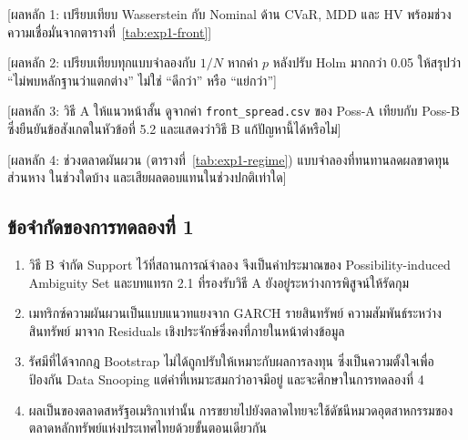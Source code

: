 [ผลหลัก 1: เปรียบเทียบ Wasserstein กับ Nominal ด้าน CVaR, MDD และ HV
พร้อมช่วงความเชื่อมั่นจากตารางที่~\ref{tab:exp1-front}]

[ผลหลัก 2: เปรียบเทียบทุกแบบจำลองกับ $1/N$ หากค่า $p$ หลังปรับ Holm มากกว่า 0.05
ให้สรุปว่า ``ไม่พบหลักฐานว่าแตกต่าง'' ไม่ใช่ ``ดีกว่า'' หรือ ``แย่กว่า'']

[ผลหลัก 3: วิธี A ให้แนวหน้าสั้น ดูจากค่า \texttt{front\_spread.csv} ของ Poss-A เทียบกับ Poss-B
ซึ่งยืนยันข้อสังเกตในหัวข้อที่ 5.2 และแสดงว่าวิธี B แก้ปัญหานี้ได้หรือไม่]

[ผลหลัก 4: ช่วงตลาดผันผวน (ตารางที่~\ref{tab:exp1-regime}) แบบจำลองที่ทนทานลดผลขาดทุนส่วนหาง
ในช่วงใดบ้าง และเสียผลตอบแทนในช่วงปกติเท่าใด]

\subsection{ข้อจำกัดของการทดลองที่ 1}
\begin{enumerate}
\item วิธี B จำกัด Support ไว้ที่สถานการณ์จำลอง จึงเป็นค่าประมาณของ Possibility-induced
Ambiguity Set และบทแทรก 2.1 ที่รองรับวิธี A ยังอยู่ระหว่างการพิสูจน์ให้รัดกุม
\item เมทริกซ์ความผันผวนเป็นแบบแนวทแยงจาก GARCH รายสินทรัพย์ ความสัมพันธ์ระหว่างสินทรัพย์
มาจาก Residuals เชิงประจักษ์ซึ่งคงที่ภายในหน้าต่างข้อมูล
\item รัศมีที่ได้จากกฎ Bootstrap ไม่ได้ถูกปรับให้เหมาะกับผลการลงทุน ซึ่งเป็นความตั้งใจเพื่อป้องกัน
Data Snooping แต่ค่าที่เหมาะสมกว่าอาจมีอยู่ และจะศึกษาในการทดลองที่ 4
\item ผลเป็นของตลาดสหรัฐอเมริกาเท่านั้น การขยายไปยังตลาดไทยจะใช้ดัชนีหมวดอุตสาหกรรมของ
ตลาดหลักทรัพย์แห่งประเทศไทยด้วยขั้นตอนเดียวกัน
\end{enumerate}
